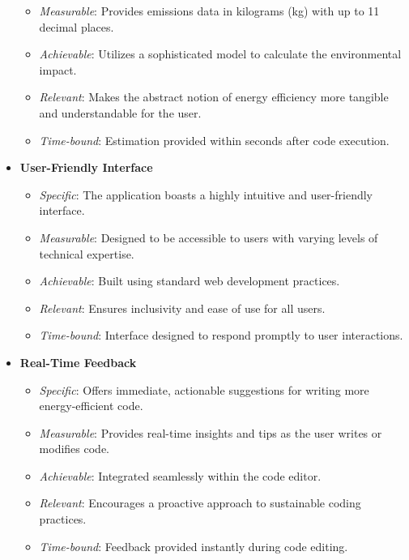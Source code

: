 \documentclass[conference,compsoc]{IEEEtran}
\begin{document}
\begin{itemize}
\begin{itemize}
		      \item \textit{Measurable}: Provides emissions data in kilograms (kg) with up to 11 decimal places.
		      \item \textit{Achievable}: Utilizes a sophisticated model to calculate the environmental impact.
		      \item \textit{Relevant}: Makes the abstract notion of energy efficiency more tangible and understandable for the user.
		      \item \textit{Time-bound}: Estimation provided within seconds after code execution.
	      \end{itemize}
	\item \textbf{User-Friendly Interface}
	      \begin{itemize}
		      \item \textit{Specific}: The application boasts a highly intuitive and user-friendly interface.
		      \item \textit{Measurable}: Designed to be accessible to users with varying levels of technical expertise.
		      \item \textit{Achievable}: Built using standard web development practices.
		      \item \textit{Relevant}: Ensures inclusivity and ease of use for all users.
		      \item \textit{Time-bound}: Interface designed to respond promptly to user interactions.
	      \end{itemize}
	\item \textbf{Real-Time Feedback}
	      \begin{itemize}
		      \item \textit{Specific}: Offers immediate, actionable suggestions for writing more energy-efficient code.
		      \item \textit{Measurable}: Provides real-time insights and tips as the user writes or modifies code.
		      \item \textit{Achievable}: Integrated seamlessly within the code editor.
		      \item \textit{Relevant}: Encourages a proactive approach to sustainable coding practices.
		      \item \textit{Time-bound}: Feedback provided instantly during code editing.
	      \end{itemize}
\end{itemize}
\end{document}
